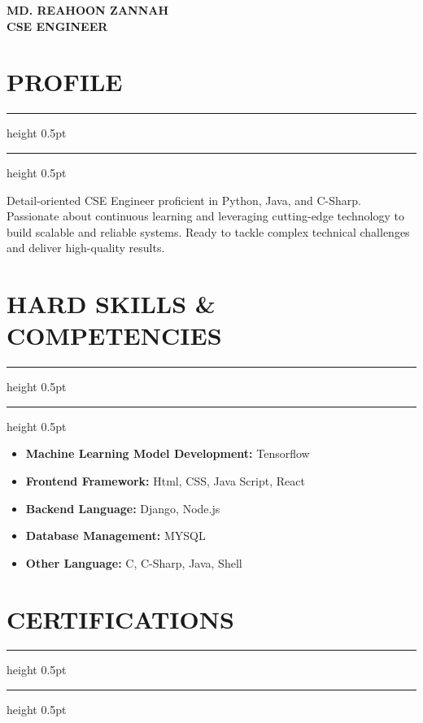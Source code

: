 \documentclass[10pt, a4paper]{scrartcl}
\newcommand{\maintitle}[1]{
    \section*{#1}
    \vspace{-6pt} %
    \hrule height 0.5pt \vspace{2pt}
    \hrule height 0.5pt \vspace{4pt}
}
\newcommand{\experience}[4]{%
    \vspace{4pt}
    \textbf{#1} \hfill \textit{#2} \\
    \textit{#3} \par %
    \vspace{2pt}
    \begin{itemize}[label=\tiny\textbullet, noitemsep, topsep=2pt, parsep=0pt, leftmargin=1em]
        #4
    \end{itemize}
}
\begin{document}
\begin{minipage}[t]{0.68\textwidth}
    \vspace{0pt} %

    \begin{center}
        \Huge\textbf{MD. REAHOON ZANNAH} \\
        \Large\color{AccentColor}\textbf{CSE ENGINEER}
    \end{center}
    \vspace{8pt}

    \maintitle{PROFILE} 
    \small
    Detail-oriented CSE Engineer proficient in Python, Java, and C-Sharp. Passionate about continuous learning and leveraging cutting-edge technology to build scalable and reliable systems. Ready to tackle complex technical challenges and deliver high-quality results.

    \maintitle{HARD SKILLS \& COMPETENCIES}

    \begin{itemize}
        \item \textbf{Machine Learning Model Development:}
        {Tensorflow}
    

        \item \textbf{Frontend Framework:}
        {Html, CSS, Java Script, React}

        \item  \textbf{Backend Language:}
        {Django, Node.js}

        \item \textbf{Database Management:}
        {MYSQL}

        \item \textbf{Other Language: }
        {C, C-Sharp, Java, Shell}

    \end{itemize}

    
    

    \maintitle{CERTIFICATIONS}


\end{minipage}
\end{document}
